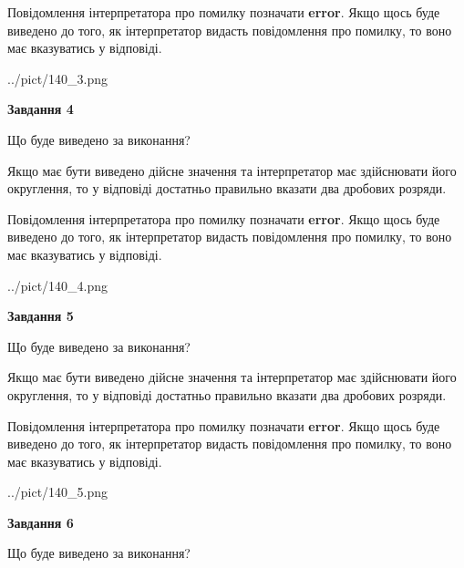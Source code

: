 \documentclass[12pt, ukrainian]{article}
\begin{document}
{\begin {Large}
Повідомлення інтерпретатора про помилку позначати \textbf{error}.
Якщо щось буде виведено до того, як інтерпретатор видасть повідомлення про помилку, 
то воно має вказуватись у відповіді. \par

\begin{center}
	{../pict/140_3.png}
\end{center}
\newpage

{\begin {center}\textbf{Завдання 4}\end {center}}\par
Що буде виведено за виконання? \par

Якщо має бути виведено дійсне значення та інтерпретатор має здійснювати його округлення, 
то у відповіді достатньо правильно вказати два дробових розряди.

Повідомлення інтерпретатора про помилку позначати \textbf{error}.
Якщо щось буде виведено до того, як інтерпретатор видасть повідомлення про помилку, 
то воно має вказуватись у відповіді. \par

\begin{center}
	{../pict/140_4.png}
\end{center}
\newpage

{\begin {center}\textbf{Завдання 5}\end {center}}\par
Що буде виведено за виконання? \par

Якщо має бути виведено дійсне значення та інтерпретатор має здійснювати його округлення, 
то у відповіді достатньо правильно вказати два дробових розряди.

Повідомлення інтерпретатора про помилку позначати \textbf{error}.
Якщо щось буде виведено до того, як інтерпретатор видасть повідомлення про помилку, 
то воно має вказуватись у відповіді. \par

\begin{center}
	{../pict/140_5.png}
\end{center}
\newpage

{\begin {center}\textbf{Завдання 6}\end {center}}\par
Що буде виведено за виконання? \par


\end{Large}}
\end{document}

